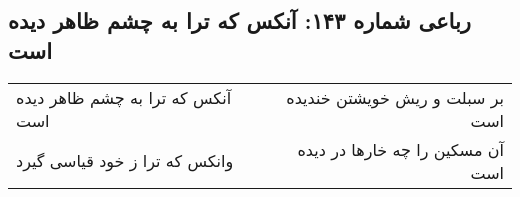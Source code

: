 \begin{center}
\section*{رباعی شماره ۱۴۳: آنکس که ترا به چشم ظاهر دیده است}
\label{sec:0143}
\begin{longtable}{l p{0.5cm} r}
آنکس که ترا به چشم ظاهر دیده است
&&
بر سبلت و ریش خویشتن خندیده است
\\
وانکس که ترا ز خود قیاسی گیرد
&&
آن مسکین را چه خارها در دیده است
\\
\end{longtable}
\end{center}
